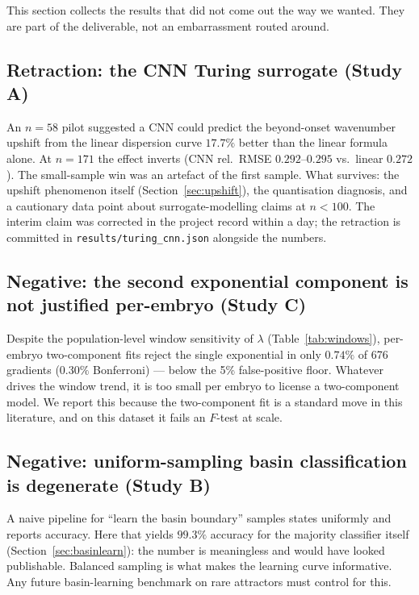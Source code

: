 \label{sec:negatives}

This section collects the results that did not come out the way we wanted.
They are part of the deliverable, not an embarrassment routed around.

\subsection{Retraction: the CNN Turing surrogate (Study A)}

An $n = 58$ pilot suggested a CNN could predict the beyond-onset wavenumber
upshift from the linear dispersion curve $17.7\%$ better than the linear
formula alone. At $n = 171$ the effect inverts (CNN rel.\ RMSE $0.292$--$0.295$
vs.\ linear $0.272$). The small-sample win was an artefact of the first
sample. What survives: the upshift phenomenon itself (Section~\ref{sec:upshift}),
the quantisation diagnosis, and a cautionary data point about
surrogate-modelling claims at $n < 100$. The interim claim was corrected in
the project record within a day; the retraction is committed in
\texttt{results/turing\_cnn.json} alongside the numbers.

\subsection{Negative: the second exponential component is not justified
per-embryo (Study C)}

Despite the population-level window sensitivity of $\lambda$
(Table~\ref{tab:windows}), per-embryo two-component fits reject the single
exponential in only $0.74\%$ of 676 gradients ($0.30\%$ Bonferroni) --- below
the 5\% false-positive floor. Whatever drives the window trend, it is too
small per embryo to license a two-component model. We report this because the
two-component fit is a standard move in this literature, and on this dataset
it fails an $F$-test at scale.

\subsection{Negative: uniform-sampling basin classification is degenerate
(Study B)}

A naive pipeline for ``learn the basin boundary'' samples states uniformly
and reports accuracy. Here that yields $99.3\%$ accuracy for the majority
classifier itself (Section~\ref{sec:basinlearn}): the number is meaningless
and would have looked publishable. Balanced sampling is what makes the
learning curve informative. Any future basin-learning benchmark on rare
attractors must control for this.

